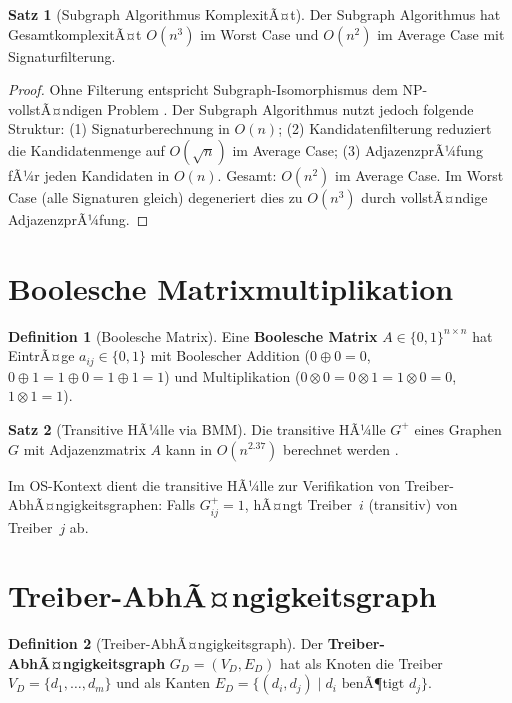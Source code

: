 ﻿\documentclass[a4paper,12pt]{scrreprt}
\theoremstyle{definition}
\newtheorem{definition}{Definition}[chapter]
\newtheorem{satz}{Satz}[chapter]
\begin{document}
	\begin{satz}[Subgraph Algorithmus KomplexitÃ¤t]\label{satz:subgraph_comp}
		Der Subgraph Algorithmus hat GesamtkomplexitÃ¤t $O(n^3)$ im Worst Case
		und $O(n^2)$ im Average Case mit Signaturfilterung.
	\end{satz}
	
	\begin{proof}
		Ohne Filterung entspricht Subgraph-Isomorphismus dem NP-vollstÃ¤ndigen
		Problem \cite{Cook1971}. Der Subgraph Algorithmus nutzt jedoch folgende
		Struktur: (1) Signaturberechnung in $O(n)$; (2) Kandidatenfilterung
		reduziert die Kandidatenmenge auf $O(\sqrt{n})$ im Average Case;
		(3) AdjazenzprÃ¼fung fÃ¼r jeden Kandidaten in $O(n)$. Gesamt: $O(n^2)$
		im Average Case. Im Worst Case (alle Signaturen gleich) degeneriert
		dies zu $O(n^3)$ durch vollstÃ¤ndige AdjazenzprÃ¼fung.
	\end{proof}
	
	\section{Boolesche Matrixmultiplikation}
	
	\begin{definition}[Boolesche Matrix]
		Eine \textbf{Boolesche Matrix} $A \in \{0,1\}^{n \times n}$ hat
		EintrÃ¤ge $a_{ij} \in \{0,1\}$ mit Boolescher Addition
		($0 \oplus 0 = 0$, $0 \oplus 1 = 1 \oplus 0 = 1 \oplus 1 = 1$)
		und Multiplikation ($0 \otimes 0 = 0 \otimes 1 = 1 \otimes 0 = 0$,
		$1 \otimes 1 = 1$).
	\end{definition}
	
	\begin{satz}[Transitive HÃ¼lle via BMM]\label{satz:bmm}
		Die transitive HÃ¼lle $G^+$ eines Graphen $G$ mit Adjazenzmatrix $A$
		kann in $O(n^{2.37})$ berechnet werden \cite{Epp2026boolmm}.
	\end{satz}
	
	Im OS-Kontext dient die transitive HÃ¼lle zur Verifikation von
	Treiber-AbhÃ¤ngigkeitsgraphen: Falls $G^+_{ij} = 1$, hÃ¤ngt Treiber~$i$
	(transitiv) von Treiber~$j$ ab.
	
	\section{Treiber-AbhÃ¤ngigkeitsgraph}
	
	\begin{definition}[Treiber-AbhÃ¤ngigkeitsgraph]
		Der \textbf{Treiber-AbhÃ¤ngigkeitsgraph} $G_D = (V_D, E_D)$ hat als
		Knoten die Treiber $V_D = \{d_1, \ldots, d_m\}$ und als Kanten
		$E_D = \{(d_i, d_j) \mid d_i \text{ benÃ¶tigt } d_j\}$.
	\end{definition}
	
\end{document}
